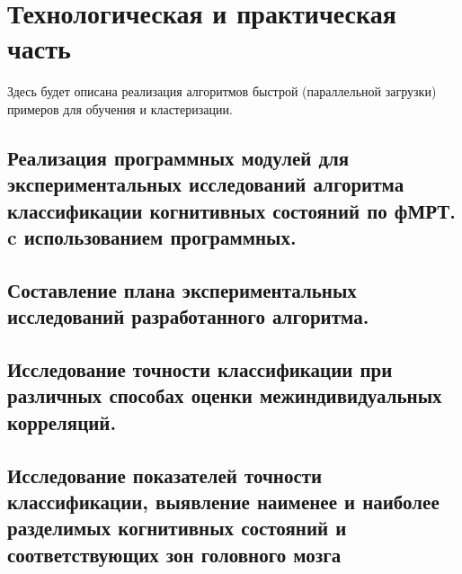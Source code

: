 \chapter{Технологическая и практическая часть}
\begin{annotation}
	Здесь будет описана реализация алгоритмов быстрой (параллельной загрузки) примеров для обучения и кластеризации.
\end{annotation}

\section{Реализация программных модулей для экспериментальных исследований алгоритма классификации когнитивных состояний по фМРТ. c использованием программных.}

\section{Составление плана экспериментальных исследований разработанного алгоритма.}

\section{Исследование точности классификации при различных	способах оценки межиндивидуальных корреляций.}

\section{Исследование показателей точности классификации, выявление наименее и наиболее разделимых когнитивных состояний и соответствующих зон головного мозга}
\